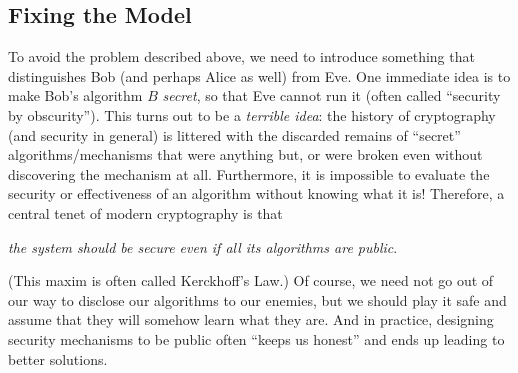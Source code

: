 \documentclass[11pt]{article}
\begin{document}
\subsection{Fixing the Model}
\label{sec:fixing-model}

To avoid the problem described above, we need to introduce something
that distinguishes Bob (and perhaps Alice as well) from Eve.  One
immediate idea is to make Bob's algorithm $B$ \emph{secret}, so that
Eve cannot run it (often called ``security by obscurity'').  This
turns out to be a \emph{terrible idea}: the history of cryptography
(and security in general) is littered with the discarded remains of
``secret'' algorithms/mechanisms that were anything but, or were
broken even without discovering the mechanism at all.  Furthermore, it
is impossible to evaluate the security or effectiveness of an
algorithm without knowing what it is!  Therefore, a central tenet of
modern cryptography is that
\begin{center}
  \emph{the system should be secure even if all its algorithms are
    public}.
\end{center}
(This maxim is often called Kerckhoff's Law.)  Of course, we need not
go out of our way to disclose our algorithms to our enemies, but we
should play it safe and assume that they will somehow learn what they
are.  And in practice, designing security mechanisms to be public
often ``keeps us honest'' and ends up leading to better solutions.
\end{document}
